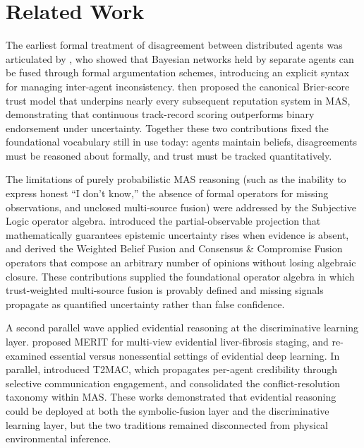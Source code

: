\section{Related Work}\label{sec:related_work}

The earliest formal treatment of disagreement between distributed agents was articulated by \citet{nielsen2006application}, who showed that Bayesian networks held by separate agents can be fused through formal argumentation schemes, introducing an explicit syntax for managing inter-agent inconsistency. \citet{wang2007formal} then proposed the canonical Brier-score trust model that underpins nearly every subsequent reputation system in MAS, demonstrating that continuous track-record scoring outperforms binary endorsement under uncertainty. Together these two contributions fixed the foundational vocabulary still in use today: agents maintain beliefs, disagreements must be reasoned about formally, and trust must be tracked quantitatively.

The limitations of purely probabilistic MAS reasoning (such as the inability to express honest ``I don't know,'' the absence of formal operators for missing observations, and unclosed multi-source fusion) were addressed by the Subjective Logic operator algebra. \citet{kaplan2015partial} introduced the partial-observable projection that mathematically guarantees epistemic uncertainty rises when evidence is absent, and \citet{vanderheijden2018multisource} derived the Weighted Belief Fusion and Consensus \& Compromise Fusion operators that compose an arbitrary number of opinions without losing algebraic closure. These contributions supplied the foundational operator algebra in which trust-weighted multi-source fusion is provably defined and missing signals propagate as quantified uncertainty rather than false confidence.

A second parallel wave applied evidential reasoning at the discriminative learning layer. \citet{liu2025merit} proposed MERIT for multi-view evidential liver-fibrosis staging, and \citet{chen2025revisiting} re-examined essential versus nonessential settings of evidential deep learning. In parallel, \citet{sun2024t2mac} introduced T2MAC, which propagates per-agent credibility through selective communication engagement, and \citet{chikoti2025conflict} consolidated the conflict-resolution taxonomy within MAS. These works demonstrated that evidential reasoning could be deployed at both the symbolic-fusion layer and the discriminative learning layer, but the two traditions remained disconnected from physical environmental inference.

